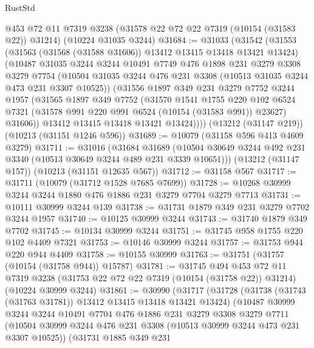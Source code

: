 \begin{lexlean}{RustStd}
\begin{coremodule}
{\begin{coremodule}
{{{{{{{{{{{{{{{{{{{{{{{{{{    @453
    @72
    @11
    @7319
    @3238
    (@31578 @22 @72 @22 @7319 (@10154 (@31583 @22)) @31214)
    (@10224 @31035 @3244)
@31684 := @31033
    (@31542
      (@31553
        (@31563 (@31568 (@31588 @31606)) @13412 @13415 @13418 @13421 @13424)
        (@10487
          @31035
          @3244
          @3244
          @10491
          @7749
          @476
          @1898
          @231
          @3279
          @3308
          @3279
          @7754
          (@10504 @31035 @3244 @476 @231 @3308 (@10513 @31035 @3244 @473 @231 @3307 @10525))
          (@31556
            @1897
            @349
            @231
            @3279
            @7752
            @3244
            @1957
            (@31565
              @1897
              @349
              @7752
              (@31570
                @1541
                @1755
                @220
                @102
                @6524
                @7321
                (@31578 @991 @220 @991 @6524 (@10154 (@31583 @991)) @23627)
                @31606))
            @13412
            @13415
            @13418
            @13421
            @13424))))
    (@13212 (@31147 @219))
    (@10213 (@31151 @1246 @596))
@31689 := @10079 (@31158 @596 @413 @4609 @3279)
@31711 := @31016
    (@31684
      @31689
      (@10504 @30649 @3244 @492 @231 @3340 (@10513 @30649 @3244 @489 @231 @3339 @10651)))
    (@13212 (@31147 @157))
    (@10213 (@31151 @12635 @567))
@31712 := @31158 @567
@31717 := @31711 (@10079 (@31712 @1528 @7685 @7699))
@31728 := @10268 @30999 @3244 @3244 @1880 @476 @1886 @231 @3279 @7704 @3279 @7713
@31731 := @10111 @30999 @3244 @139
@31738 := @31731 @1879 @349 @231 @3279 @7702 @3244 @1957
@31740 := @10125 @30999 @3244
@31743 := @31740 @1879 @349 @7702
@31745 := @10134 @30999 @3244
@31751 := @31745 @958 @1755 @220 @102 @4409 @7321
@31753 := @10146 @30999 @3244
@31757 := @31753 @944 @220 @944 @4409
@31758 := @10155 @30999
@31763 := @31751 (@31757 (@10154 (@31758 @944)) @15787)
@31781 := @31745
    @494
    @453
    @72
    @11
    @7319
    @3238
    (@31753 @22 @72 @22 @7319 (@10154 (@31758 @22)) @31214)
    (@10224 @30999 @3244)
@31861 := @30990
    (@31717
      (@31728
        (@31738 (@31743 (@31763 @31781)) @13412 @13415 @13418 @13421 @13424)
        (@10487
          @30999
          @3244
          @3244
          @10491
          @7704
          @476
          @1886
          @231
          @3279
          @3308
          @3279
          @7711
          (@10504 @30999 @3244 @476 @231 @3308 (@10513 @30999 @3244 @473 @231 @3307 @10525))
          (@31731
            @1885
            @349
            @231
}}}}}}}}}}}}}}}}}}}}}}}}}}
\end{coremodule}}
\end{coremodule}
\end{lexlean}
